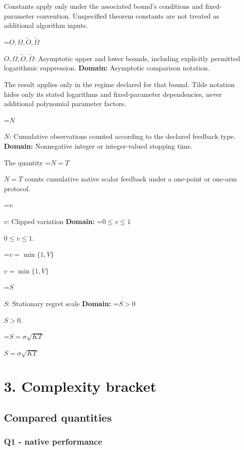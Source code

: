 \documentclass[10pt,a4paper]{article}
\newcommand{\AtlasMath}[1]{\par\begingroup\centering\setbox0=\hbox{$\displaystyle #1$}\ifdim\wd0>1.4\linewidth\typeout{ATLAS WIDE FORMULA: \the\wd0}\fi\ifdim\wd0>\linewidth\resizebox{\linewidth}{!}{\box0}\else\box0\fi\par\endgroup}
\newcommand{\AtlasInlineMath}[1]{\begingroup\setbox0=\hbox{$#1$}\ifdim\wd0>.4\linewidth\endgroup\AtlasMath{#1}\else\endgroup$#1$\fi}
\begin{document}
Constants apply only under the associated bound’s conditions and fixed-parameter convention. Unspecified theorem constants are not treated as additional algorithm inputs.



\AtlasInlineMath{O,\Omega,\widetilde O,\widetilde\Omega}: Asymptotic upper and lower bounds, including explicitly permitted logarithmic suppression. \textbf{Domain:} Asymptotic comparison notation.



The result applies only in the regime declared for that bound. Tilde notation hides only its stated logarithms and fixed-parameter dependencies, never additional polynomial parameter factors.



\AtlasInlineMath{N}: Cumulative observations counted according to the declared feedback type. \textbf{Domain:} Nonnegative integer or integer-valued stopping time.



The quantity \AtlasInlineMath{N=T} counts cumulative native scalar feedback under a one-point or one-arm protocol.



\AtlasInlineMath{v}: Clipped variation \textbf{Domain:} \AtlasInlineMath{0\le v\le1}.



\AtlasInlineMath{v=\min\{1,V\}}



\AtlasInlineMath{S}: Stationary regret scale \textbf{Domain:} \AtlasInlineMath{S>0}.



\AtlasInlineMath{S=\sigma\sqrt{KT}}



\section{3. Complexity bracket}


\subsection{Compared quantities}


\subsubsection{Q1 - native performance}
\end{document}

